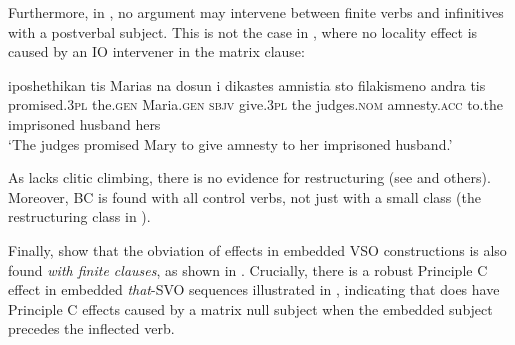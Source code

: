 \documentclass[output=paper]{langsci/langscibook}
\begin{document}
\ea%
    \label{ex:alexiadou:22}
    \z
\z   


Furthermore, in , no argument may intervene between finite verbs and infinitives with a postverbal subject. This is not the case in , where no locality effect is caused by an IO intervener in the matrix clause:

\begin{exe}%
\end{exe}

  

\ea%
    \label{ex:alexiadou:24}
    \gll iposhethikan     tis Marias  na  dosun       i dikastes     amnistia   sto filakismeno      andra     tis\\
         promised.\textsc{3pl}    the.\textsc{gen} Maria.\textsc{gen} \textsc{sbjv} give.\textsc{3pl} the judges.\textsc{nom}   amnesty.\textsc{acc} to.the imprisoned husband hers\\
    \glt   ‘The judges promised Mary to give amnesty to her imprisoned husband.’
    \z

As  lacks clitic climbing, there is no evidence for restructuring (see \citealt{Terzi1992} and others). Moreover, BC is found with all control verbs, not just with a small class (the restructuring class in ).

Finally, \citet{Tsakali2017} show that the obviation of  effects in embedded VSO constructions is also found \emph{with finite clauses}, as shown in . Crucially, there is a robust Principle C effect in embedded \textit{that}{}-SVO sequences illustrated in , indicating that  does have Principle C effects caused by a matrix null subject when the embedded subject precedes the inflected verb.
\end{document}
